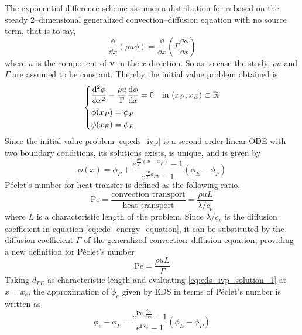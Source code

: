 The exponential difference scheme assumes a distribution for $\phi$ based on the steady 2--dimensional generalized convection--diffusion equation with no source term, that is to say,
\begin{equation}
	\frac{\dd}{\dd{x}} (\rho u \phi) = \frac{\dd}{\dd{x}} \left( \Gamma \frac{\dd{\phi}}{\dd{x}} \right)
\end{equation}
where $u$ is the component of $\vb{v}$ in the $x$ direction. So as to ease the study, $\rho u$ and $\Gamma$ are assumed to be constant. Thereby the initial value problem obtained is
\begin{equation} \label{eq:eds_ivp}
	\left\{
	\begin{aligned}
		&\frac{\dd^2 \phi}{\phi{x^2}} - \frac{\rho u}{\Gamma} \frac{\dd{\phi}}{\dd{x}} = 0 & &\text{in } (x_P, x_E) \subset \mathbb{R} \\
		&\phi(x_P) = \phi_P \\
		&\phi(x_E) = \phi_E \\
	\end{aligned}
	\right.
\end{equation}
Since the initial value problem \eqref{eq:eds_ivp} is a second order linear ODE with two boundary conditions, its solutions exists, is unique, and is given by
\begin{equation} \label{eq:eds_ivp_solution_1}
	\phi(x) = 
	\phi_P +
	\frac{e^{\frac{\rho u}{\Gamma} (x - x_P)} - 1}{e^{\frac{\rho u}{\Gamma} d_{PE}} - 1} (\phi_E - \phi_P)
\end{equation}
Péclet's number for heat transfer is defined as the following ratio,
\begin{equation}
	\mathrm{Pe} = 
	\frac{\text{convection transport}}{\text{heat transport}} = 
	\frac{\rho u L}{\lambda / c_p}
\end{equation}
where $L$ is a characteristic length of the problem. Since $\lambda / c_p$ is the diffusion coefficient in equation \eqref{eq:cde_energy_equation}, it can be substituted by the diffusion coefficient $\Gamma$ of the generalized convection--diffusion equation, providing a new definition for Péclet's number 
\begin{equation}
	\mathrm{Pe} = 
	\frac{\rho u L}{\Gamma}
\end{equation}
Taking $d_{PE}$ as characteristic length and evaluating \eqref{eq:eds_ivp_solution_1} at $x = x_e$, the approximation of $\phi_e$ given by EDS in terms of Péclet's number is written as
\begin{equation} \label{eq:eds_e}
	\phi_e - \phi_P = 
	\frac{e^{\mathrm{Pe}_e \frac{d_{Pe}}{d_{PE}}} - 1}{e^{\mathrm{Pe}_e} - 1} (\phi_E - \phi_P)
\end{equation}
